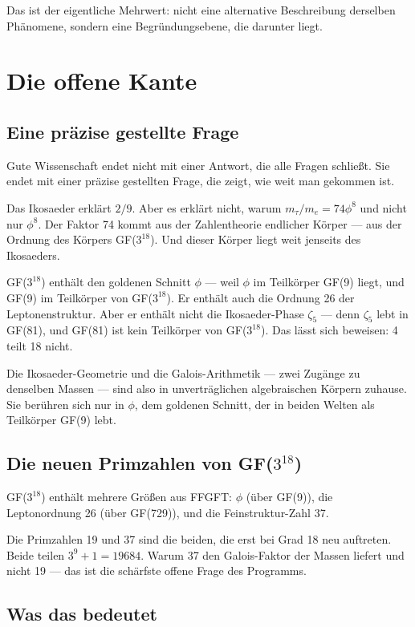 \documentclass[12pt,oneside]{book}
\begin{document}
Das ist der eigentliche Mehrwert: nicht eine alternative Beschreibung derselben Phänomene, sondern eine Begründungsebene, die darunter liegt.

\chapter{Die offene Kante}

\section{Eine präzise gestellte Frage}

Gute Wissenschaft endet nicht mit einer Antwort, die alle Fragen schließt. Sie endet mit einer präzise gestellten Frage, die zeigt, wie weit man gekommen ist.

Das Ikosaeder erklärt $2/9$. Aber es erklärt nicht, warum $m_\tau/m_e = 74 \phi^8$ und nicht nur $\phi^8$. Der Faktor 74 kommt aus der Zahlentheorie endlicher Körper — aus der Ordnung des Körpers GF($3^{18}$). Und dieser Körper liegt weit jenseits des Ikosaeders.

GF($3^{18}$) enthält den goldenen Schnitt $\phi$ — weil $\phi$ im Teilkörper GF(9) liegt, und GF(9) im Teilkörper von GF($3^{18}$). Er enthält auch die Ordnung 26 der Leptonenstruktur. Aber er enthält nicht die Ikosaeder-Phase $\zeta_5$ — denn $\zeta_5$ lebt in GF(81), und GF(81) ist kein Teilkörper von GF($3^{18}$). Das lässt sich beweisen: 4 teilt 18 nicht.

Die Ikosaeder-Geometrie und die Galois-Arithmetik — zwei Zugänge zu denselben Massen — sind also in unverträglichen algebraischen Körpern zuhause. Sie berühren sich nur in $\phi$, dem goldenen Schnitt, der in beiden Welten als Teilkörper GF(9) lebt.

\section{Die neuen Primzahlen von GF($3^{18}$)}

GF($3^{18}$) enthält mehrere Größen aus FFGFT: $\phi$ (über GF(9)), die Leptonordnung 26 (über GF(729)), und die Feinstruktur-Zahl 37.

Die Primzahlen 19 und 37 sind die beiden, die erst bei Grad 18 neu auftreten. Beide teilen $3^9 + 1 = 19684$. Warum 37 den Galois-Faktor der Massen liefert und nicht 19 — das ist die schärfste offene Frage des Programms.

\section{Was das bedeutet}
\end{document}
